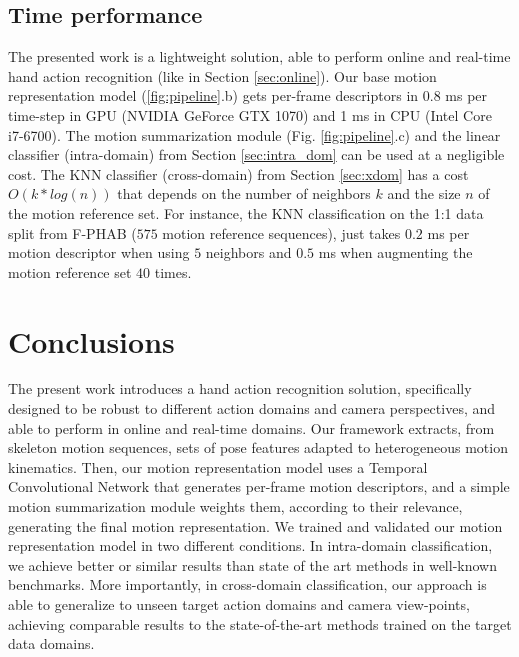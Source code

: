 \documentclass[letterpaper, 10 pt, conference]{ieeeconf}
\begin{document}
\subsection{Time performance}\label{sec:time}
The presented work is a lightweight solution, able to perform online and real-time hand action recognition (like in Section \ref{sec:online}).
Our base motion representation model (\ref{fig:pipeline}.b) gets per-frame descriptors in 0.8 ms per time-step in GPU (NVIDIA GeForce GTX 1070) 
and 1 ms in CPU (Intel Core  i7-6700).
The motion summarization module (Fig. \ref{fig:pipeline}.c) and the linear classifier (intra-domain) from Section \ref{sec:intra_dom} can be used at a negligible cost.
The KNN classifier (cross-domain) from Section \ref{sec:xdom} has a cost \(O(k * log(n))\) that depends on the number of neighbors \(k\) and the size \(n\) of the motion reference set. 
For instance, the KNN classification on the 1:1 data split from F-PHAB (\(575\) motion reference sequences), just takes \(0.2\) ms per motion descriptor when using \(5\) neighbors and \(0.5\) ms when augmenting the motion reference set \(40\) times.



\section{Conclusions}

The present work introduces a hand action recognition solution, specifically designed to be robust to different action domains and camera perspectives, and able to perform in online and real-time domains.
Our framework extracts, from skeleton motion sequences, sets of pose features adapted to heterogeneous motion kinematics.
Then, our motion representation model uses a Temporal Convolutional Network that generates per-frame motion descriptors, and a simple motion summarization module weights them, according to their relevance, generating the final motion representation.
We trained and validated our motion representation model in two different conditions. In intra-domain classification, we achieve better or similar results than state of the art methods 
in well-known benchmarks.
More importantly, in cross-domain classification, our approach is able to generalize to unseen target action domains and camera view-points, achieving comparable results to the state-of-the-art methods trained on the target data domains.

{


}
\end{document}
